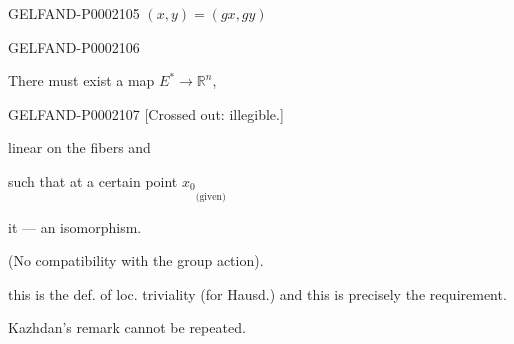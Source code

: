 \begin{GelfandAdjacentEvidence}{GELFAND-P000210}{5}
$(x, y)=(gx, gy)$
\end{GelfandAdjacentEvidence}
\begin{GelfandAdjacentEvidence}{GELFAND-P000210}{6}




\end{GelfandAdjacentEvidence}

There must exist a map $E^*\longrightarrow\mathbb R^n$,



\begin{GelfandAdjacentEvidence}{GELFAND-P000210}{7}
[Crossed out: illegible.]
\end{GelfandAdjacentEvidence}

linear on the fibers and



such that at a certain point $x_0$\quad$\underset{\text{(given)}}{\phantom{x_0}}$



it --- an isomorphism.



(No compatibility with the group action).






this is the def. of loc. triviality (for Hausd.) and this is precisely the requirement.



Kazhdan's remark cannot be repeated.






